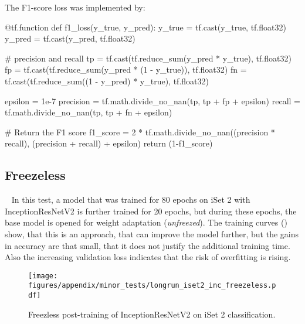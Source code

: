 The F1-score loss was implemented by:

\begin{python}
    @tf.function
    def f1_loss(y_true, y_pred):
        y_true = tf.cast(y_true, tf.float32)
        y_pred = tf.cast(y_pred, tf.float32)
        
        # precision and recall
        tp = tf.cast(tf.reduce_sum(y_pred * y_true), tf.float32)
        fp = tf.cast(tf.reduce_sum(y_pred * (1 - y_true)), tf.float32)
        fn = tf.cast(tf.reduce_sum((1 - y_pred) * y_true), tf.float32)
        
        epsilon = 1e-7
        precision = tf.math.divide_no_nan(tp, tp + fp + epsilon)
        recall = tf.math.divide_no_nan(tp, tp + fn + epsilon)

        # Return the F1 score
        f1_score = 2 * tf.math.divide_no_nan((precision * recall), 
                                            (precision + recall) + epsilon)
        return (1-f1_score)
\end{python}


\newpage
\subsection{Freezeless}
~\label{sec:MinorTests:sub:Freezeless}
In this test, a model that was trained for 80 epochs on iSet 2 with InceptionResNetV2 is further trained for 20 epochs, but during these epochs, the base model is opened for weight adaptation (\emph{unfreezed}).
The training curves () show, that this is an approach, that can improve the model further, but the gains in accuracy are that small, that it does not justify the additional training time. 
Also the increasing validation loss indicates that the risk of overfitting is rising.

\begin{figure}[H]
    \centering
    \texttt{[image: figures/appendix/minor\_tests/longrun\_iset2\_inc\_freezeless.pdf]}
    
    \caption{Freezless post-training of InceptionResNetV2 on iSet 2 classification.
            }
    \space\label{fig:Ap_Freezeless}
\end{figure}%





